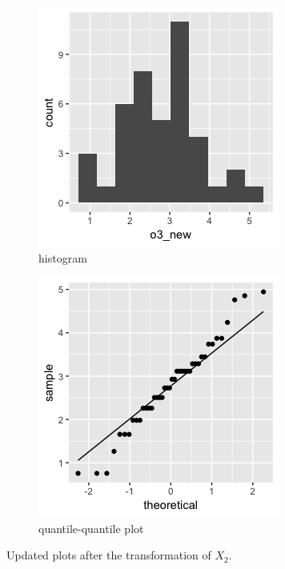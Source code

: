 \begin{figure}[H]
\begin{subfigure}{.5\textwidth}
  \centering
  \includegraphics[width=.8\linewidth]{plot_4_29_X2newhist.png}
  \caption{histogram}
  \label{fig:sfig1}
\end{subfigure}%
\begin{subfigure}{.5\textwidth}
  \centering
  \includegraphics[width=.8\linewidth]{plot_4_29_X2newqq.png}
  \caption{quantile-quantile plot}
  \label{fig:sfig2}
\end{subfigure}
\caption{Updated plots after the transformation of $X_2$.}
\end{figure}
